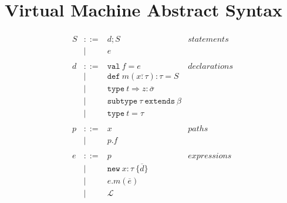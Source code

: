 \documentclass{article}
\newcommand{\keywadj}[1]{\mathtt{#1}}
\newcommand{\keyw}[1]{\keywadj{#1}~}
\begin{document}
\section{Virtual Machine Abstract Syntax}

\[
\begin{array}{lll}
\begin{array}{lllr}
S & ::= & d; S& statements \\
  & |   & e & \\
&&\\
d & ::= & \keyw{val} f = e & declarations \\
  & |   & \keyw{def} m(\overline{x:\tau}) : \tau = S &\\
  & |   & \boxed{\keyw{type} t \Rightarrow z: \overline{\sigma}} &\\
  & |   & \keyw{subtype} \tau ~\keyw{extends} \beta &\\
  & |   & \boxed{\keyw{type} t = \tau} &\\

&&\\
p & ::= & x & paths \\
& | & p.f &\\

  
&&\\
e & ::= & p & expressions \\
& | & \keywadj{new}~x:\tau~\{\overline{d}\}&\\
& | & e.m(\overline{e}) &\\
& | & \mathscr{L} &\\


\end{array}
\end{array}\]
\end{document}
